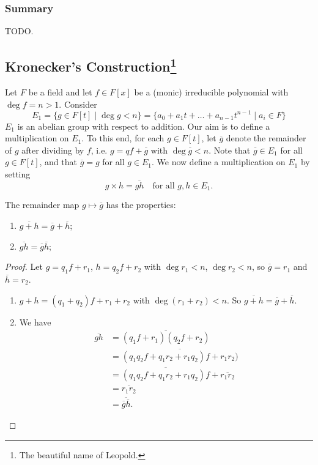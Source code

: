 \subsubsection{Summary}
TODO.

\subsection[Kronecker's Construction]{Kronecker's Construction\footnote{The beautiful name of Leopold.}}
Let $F$ be a field and let $f \in F[x]$ be a (monic) irreducible polynomial with $\deg{f} = n > 1$. Consider
\[
	E_1 = \{g \in F[t] \mid \deg{g} < n\} = \{a_0 + a_1 t + \dots + a_{n - 1}t^{n - 1} \mid a_i \in F\}
\]
$E_1$ is an abelian group with respect to addition. Our aim is to define a multiplication on $E_1$. To this end, for each $g \in F[t]$, let $\overline{g}$ denote the remainder of $g$ after dividing by $f$, i.e. $g = qf + \overline{g}$ with $\deg{\overline{g}} < n$. Note that $\overline{g} \in E_1$ for all $g \in F[t]$, and that $\overline{g} = g$ for all $g \in E_1$. We now define a multiplication on $E_1$ by setting
\[
	g \times h = \overline{gh} \quad \text{for all } g, h \in E_1.
\]

\begin{lemma}
	The remainder map $g \mapsto \overline{g}$ has the properties:
	\begin{enumerate}
		\item $\overline{g + h} = \overline{g} + \overline{h}$;
		\item $\overline{gh} = \overline{g}\overline{h}$;
	\end{enumerate}
	\begin{proof}
		Let $g = q_1 f + r_1$, $h = q_2 f + r_2$ with $\deg{r_1} < n$, $\deg{r_2} < n$, so $\overline{g} = r_1$ and $\overline{h} = r_2$.
		\begin{enumerate}
			\item $g + h = (q_1 + q_2)f + r_1 + r_2$ with $\deg{(r_1 + r_2)} < n$. So $\overline{g + h} = \overline{g} + \overline{h}$.
			\item We have
			\begin{align*}
				\overline{gh} &= \overline{(q_1 f + r_1)(q_2 f + r_2)} \\
											&= \overline{(q_1 q_2 f + q_1 r_2 + r_1 q_2)f + r_1 r_2)} \\
											&= \overline{(q_1 q_2 f + q_1 r_2 + r_1 q_2)f} + \overline{r_1 r_2} \\
											&= \overline{r_1 r_2} \\
											&= \overline{\overline{g}\overline{h}}.
			\end{align*}
		\end{enumerate}
	\end{proof}
\end{lemma}

